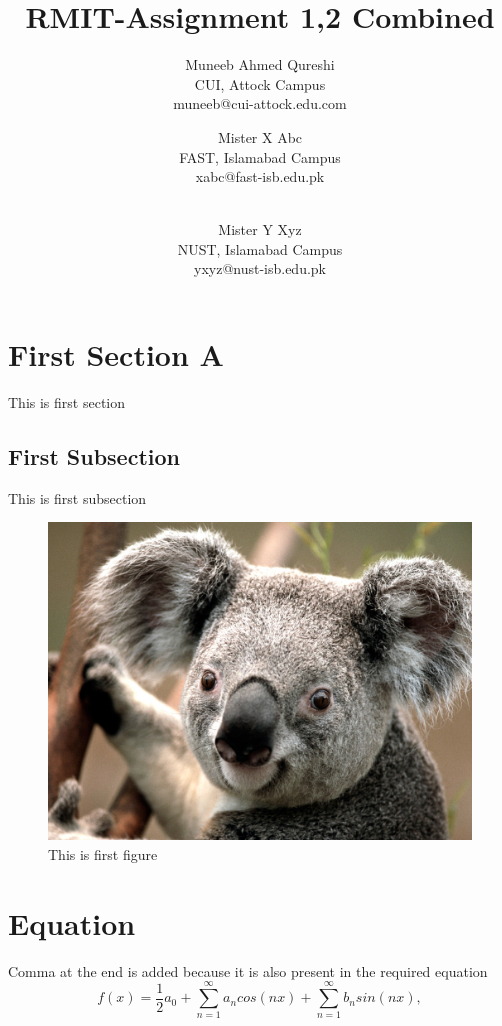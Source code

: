 \documentclass[titlepage]{article} %
\begin{document}
\title{RMIT-Assignment 1,2 Combined}
\author
{
	Muneeb Ahmed Qureshi\\
	CUI, Attock Campus\\
	muneeb@cui-attock.edu.com 
	\and 
	Mister X Abc\\
	FAST, Islamabad Campus\\
	xabc@fast-isb.edu.pk
	\and
	\\Mister Y Xyz\\
	NUST, Islamabad Campus \\
	yxyz@nust-isb.edu.pk
}
\maketitle
\section{First Section A}
This is first section
\subsection{First Subsection}
This is first subsection
\begin{figure}[h]
	\includegraphics[width=\linewidth]{koala}
	\caption{This is first figure}
\end{figure}
\section{Equation}
Comma at the end is added because it is also present in the required equation
$$f(x) = \frac{1}{2}a_0 + \sum_{n=1}^{\infty}a_n cos(nx) + \sum_{n=1}^{\infty} b_n sin(nx),$$
\\\\\\
\end{document}
